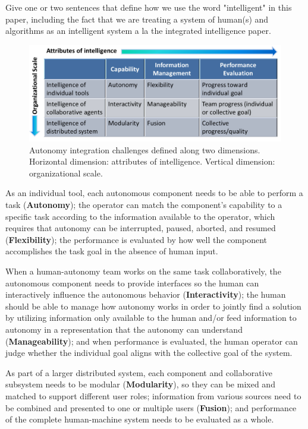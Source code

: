 \documentclass[lettersize, apacite, twoside, HRI]{apa_HRI}
\begin{document}
Give one or two sentences that define how we use the word "intelligent" in this paper, including the fact that we are treating a system of human(s) and algorithms as an intelligent system a la the integrated intelligence paper.


\begin{figure}
\centering
\includegraphics[width=5.5in]{IntegrationChallenges.JPG}
\caption{Autonomy integration challenges defined along two dimensions. Horizontal dimension: attributes of intelligence. Vertical dimension: organizational scale.}
\label{IChallenges}
\end{figure}

As an individual tool, each autonomous component needs to be able to perform a task (\textbf{Autonomy}); the operator can match the component's capability to a specific task according to the information available to the operator, which requires that autonomy can be interrupted, paused, aborted, and resumed (\textbf{Flexibility}); the performance is evaluated by how well the component accomplishes the task goal in the absence of human input.

When a human-autonomy team works on the same task collaboratively, the autonomous component needs to provide interfaces so the human can interactively influence the autonomous behavior (\textbf{Interactivity}); the human should be able to manage how autonomy works in order to jointly find a solution by utilizing information only available to the human and/or feed information to autonomy in a representation that the autonomy can understand (\textbf{Manageability}); and when performance is evaluated, the human operator can judge whether the individual goal aligns with the collective goal of the system. 

As part of a larger distributed system, each component and collaborative subsystem needs to be modular (\textbf{Modularity}), so they can be mixed and matched to support different user roles; information from various sources need to be combined and presented to one or multiple users (\textbf{Fusion}); and performance of the complete human-machine system needs to be evaluated as a whole. 
\end{document}
